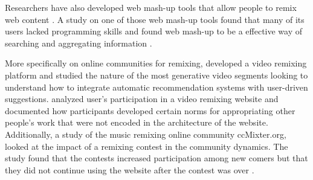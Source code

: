 Researchers have also developed web mash-up tools that allow people to remix web content \citep{bolin_automation_2005,wong_making_2007}.
A study on one of those web mash-up tools found that many of its users lacked programming skills and found web mash-up to be a effective way of searching and aggregating information \citet{nan_zang_whats_2008}.

More specifically on online communities for remixing, \citet{shaw_community_2006} developed a video remixing platform and studied the nature of the most generative video segments looking to understand how to integrate automatic recommendation systems with user-driven suggestions.
\citet{diakopoulos_evolution_2007} analyzed user's participation in a video remixing website and documented how participants developed certain norms for appropriating other people's work that were not encoded in the architecture of the website.
Additionally, a study of the music remixing online community ccMixter.org, looked at the impact of a remixing contest in the community dynamics.
The study found that the contests increased participation among new comers but that they did not continue using the website after the contest was over \citep{cheliotis_analysis_2009}. 

